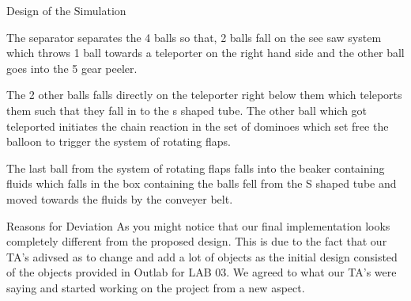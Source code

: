 \documentclass[a4paper,11pt]{resume}
\begin{document}
\begin{rSection}{{\heading Design of the Simulation}}
\begin{rSubsection}{}{}{}{}
\vspace{-25pt}
\item The separator separates the 4 balls so that, 2 balls fall on the see saw system which throws 1 ball towards a teleporter on the right hand side and the other ball goes into the 5 gear peeler. 
\item The 2 other balls falls directly on the teleporter right below them which teleports them such that they fall in to the s shaped tube. The other ball which got teleported initiates the chain reaction in the set of dominoes which set free the balloon to trigger the system of rotating flaps.
\item The last ball from the system of rotating flaps falls into the beaker containing fluids which falls in the box containing the balls fell from the S shaped tube and moved towards the fluids by the conveyer belt. 
\end{rSubsection}

\begin{rSubsection}{{\heading Reasons for Deviation}}{}{}{}
As you might notice that our final implementation looks completely different from the proposed design. This is due to the fact that our TA's adivsed as to change and add a lot of objects as the initial design consisted of the objects provided in Outlab for LAB 03. We agreed to what our TA's were saying and started working on the project from a new aspect. 
\end{rSubsection}


\end{rSection}
\end{document}

